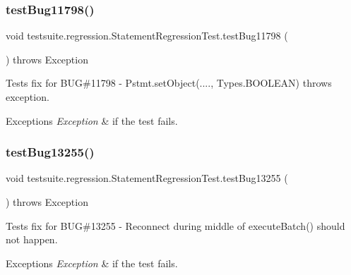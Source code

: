 \subsubsection{\texorpdfstring{test\+Bug11798()}{testBug11798()}}
{\footnotesize\ttfamily void testsuite.\+regression.\+Statement\+Regression\+Test.\+test\+Bug11798 (\begin{DoxyParamCaption}{ }\end{DoxyParamCaption}) throws Exception}

Tests fix for B\+UG\#11798 -\/ Pstmt.\+set\+Object(...., Types.\+B\+O\+O\+L\+E\+AN) throws exception.


\begin{DoxyExceptions}{Exceptions}
{\em Exception} & if the test fails. \\
\hline
\end{DoxyExceptions}
\mbox{\label{classtestsuite_1_1regression_1_1_statement_regression_test_a19979b206b845d9832b82138c997334b}} 
\subsubsection{\texorpdfstring{test\+Bug13255()}{testBug13255()}}
{\footnotesize\ttfamily void testsuite.\+regression.\+Statement\+Regression\+Test.\+test\+Bug13255 (\begin{DoxyParamCaption}{ }\end{DoxyParamCaption}) throws Exception}

Tests fix for B\+UG\#13255 -\/ Reconnect during middle of execute\+Batch() should not happen.


\begin{DoxyExceptions}{Exceptions}
{\em Exception} & if the test fails. \\
\hline
\end{DoxyExceptions}
\mbox{\label{classtestsuite_1_1regression_1_1_statement_regression_test_a91138e5fec8feb1b3680bca0bad7700d}} 

